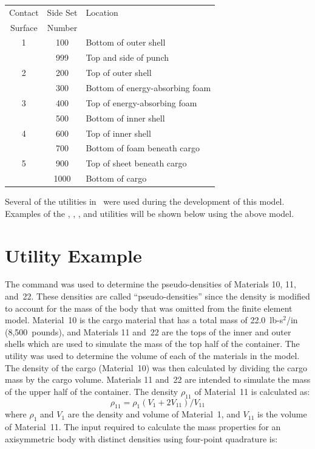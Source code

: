 \begin{center}
\begin{tabular}{|ccl|}\hline
Contact  & Side Set  &  Location \\
Surface  & Number    &            \\ \hline \hline
      1  &  100      &  Bottom of outer shell \\
         &  999      &  Top and side of punch      \\ \hline
      2  &  200      &  Top of outer shell    \\
         &  300      &  Bottom of energy-absorbing foam  \\ \hline
      3  &  400      &  Top of energy-absorbing foam  \\
         &  500      &  Bottom of inner shell         \\ \hline
      4  &  600      &  Top of inner shell \\
         &  700      &  Bottom of foam beneath cargo  \\ \hline
      5  &  900      &  Top of sheet beneath cargo \\
         & 1000      &  Bottom of cargo   \\ \hline
\end{tabular}
\end{center}

Several of the utilities in \numbers\ were used during the development
of this model.  Examples of the , ,
, and  utilities will be shown below using the
above model.

\section{ Utility Example}
The  command was used to determine the
pseudo-densities of Materials 10, 11, and~22.  These densities are
called ``pseudo-densities'' since the density is modified to account for
the mass of the body that was omitted from the finite element model.
Material~10 is the cargo material that has a total mass of 22.0~lb-s$^2$/in
(8,500~pounds), and Materials 11 and~22 are the tops of the inner and
outer shells which are used to simulate the mass of the top half of the
container.  The  utility was used to determine the volume of
each of the materials in the model.  The density of the cargo
(Material~10) was then calculated by dividing the cargo mass by the
cargo volume.  Materials 11 and~22 are intended to simulate the mass of
the upper half of the container.  The density $\rho_{11}$ of Material~11
is calculated as:
\begin{equation}
\rho_{11} = \rho_1 (V_1 + 2V_{11}) / V_{11}
\end{equation}
where $\rho_1$ and $V_1$ are the density and volume of Material~1, and
$V_{11}$ is the volume of Material~11.  The input required to calculate
the mass properties for an axisymmetric body with distinct densities
using four-point quadrature is:

